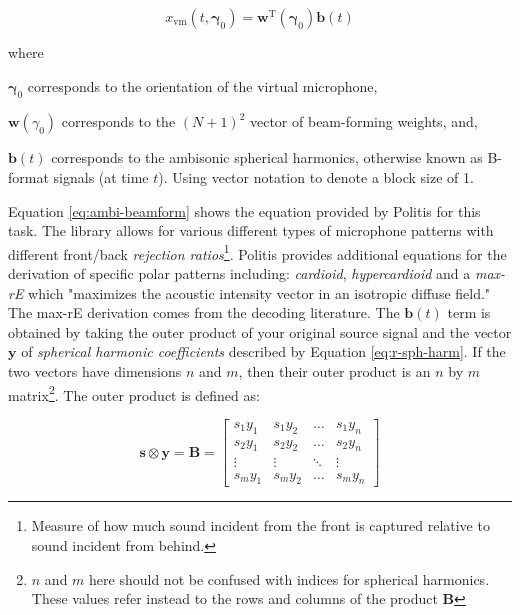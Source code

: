 \begin{equation}
x_{\mathrm{vm}}\left(t, \boldsymbol{\gamma}_{0}\right)=\mathbf{w}^{\mathrm{T}}\left(\boldsymbol{\gamma}_{0}\right) \mathbf{b}(t)
\label{eq:ambi-beamform}
\end{equation}

\noindent where
\begin{description}
\item  $\boldsymbol{\gamma}_{0}$ corresponds to the orientation of the virtual microphone,
\item  $\mathbf{w}(\gamma_{0})$ corresponds to the $(N+1)^{2}$ vector of beam-forming weights, and,
\item  $\mathbf{b}(t)$ corresponds to the ambisonic spherical harmonics, otherwise known as B-format signals (at time $t$). Using vector notation to denote a block size of 1.
\end{description}


Equation \ref{eq:ambi-beamform} shows the equation provided by Politis \cite{politis2016jsambisonics} for this task. The library allows for various different types of microphone patterns with different front/back \textit{rejection ratios}\footnote{Measure of how much sound incident from the front is captured relative to sound incident from behind.}. Politis \cite{politis2016jsambisonics} provides additional equations for the derivation of specific polar patterns including: \textit{cardioid}, \textit{hypercardioid} and a \textit{max-rE} which "maximizes the acoustic intensity vector in an isotropic diffuse field." The max-rE derivation comes from the decoding literature. The $\mathbf{b}(t)$ term is obtained by taking the outer product of your original source signal and the vector $\mathbf{y}$ of \textit{spherical harmonic coefficients} described by Equation \ref{eq:r-sph-harm}. If the two vectors have dimensions $n$ and $m$, then their outer product is an $n$ by $m$ matrix\footnote{$n$ and $m$ here should not be confused with indices for spherical harmonics. These values refer instead to the rows and columns of the product $\mathbf{B}$}. The outer product is defined as: 

\begin{equation}
\mathbf{s} \otimes \mathbf{y}=\mathbf{B}=\left[\begin{array}{cccc}
s_{1} y_{1} & s_{1} y_{2} & \ldots & s_{1} y_{n} \\
s_{2} y_{1} & s_{2} y_{2} & \ldots & s_{2} y_{n} \\
\vdots & \vdots & \ddots & \vdots \\
s_{m} y_{1} & s_{m} y_{2} & \ldots & s_{m} y_{n}
\end{array}\right]
\end{equation}

